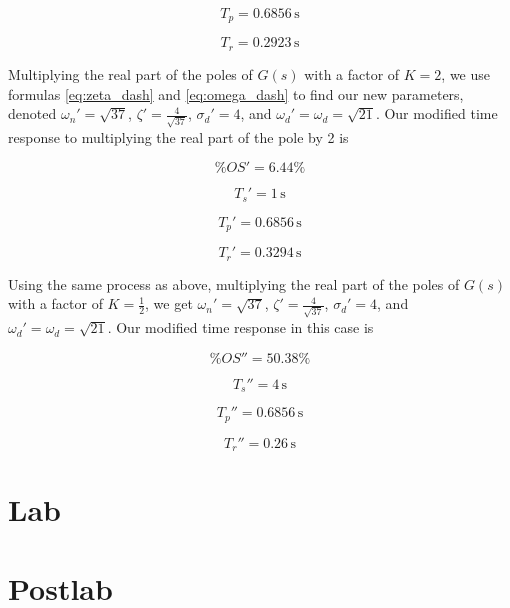 \documentclass[a4paper, 12pt]{article}
\begin{document}
			\[
				T_p = 0.6856\,\text{s}
			\]

			\[
				T_r = 0.2923\,\text{s}
			\]

			Multiplying the real part of the poles of $G(s)$ with a factor of $K=2$, we use formulas \eqref{eq:zeta_dash} and \eqref{eq:omega_dash} to find our new parameters, denoted $\omega_n' = \sqrt{37}$, $\zeta' = \frac{4}{\sqrt{37}}$, $\sigma_d' = 4$, and $\omega_d' = \omega_d = \sqrt{21}$. Our modified time response to multiplying the real part of the pole by 2 is

			\[
				\%OS' = 6.44\%
			\]

			\[
				T_s' = 1\,\text{s}
			\]

			\[
				T_p' = 0.6856\,\text{s}
			\]

			\[
				T_r' = 0.3294\,\text{s}
			\]

			Using the same process as above, multiplying the real part of the poles of $G(s)$ with a factor of $K=\frac{1}{2}$, we get $\omega_n' = \sqrt{37}$, $\zeta' = \frac{4}{\sqrt{37}}$, $\sigma_d' = 4$, and $\omega_d' = \omega_d = \sqrt{21}$. Our modified time response in this case is

			\[
				\%OS'' = 50.38\%
			\]

			\[
				T_s'' = 4\,\text{s}
			\]

			\[
				T_p'' = 0.6856\,\text{s}
			\]

			\[
				T_r'' = 0.26\,\text{s}
			\]


	\section{Lab} %
	\label{sec:lab}
		

	\section{Postlab} %
	\label{sec:postlab}
		
\end{document}
